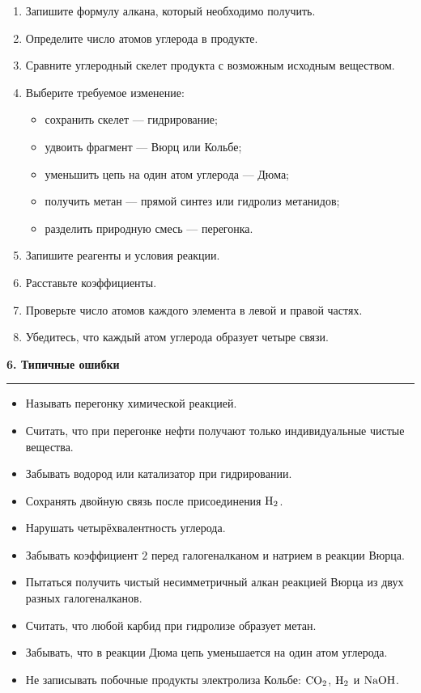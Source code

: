 \documentclass[a4paper,12pt]{article}
\newcommand{\sectiontitle}[1]{%
    \vspace{0.9em}%
    {\Large\bfseries\color{darkaccent}#1\par}%
    \vspace{0.2em}%
    {\color{accent}\rule{\linewidth}{0.8pt}}%
    \vspace{0.45em}%
}
\begin{document}
\begin{enumerate}
    \item Запишите формулу алкана, который необходимо получить.
    \item Определите число атомов углерода в продукте.
    \item Сравните углеродный скелет продукта с возможным исходным веществом.
    \item Выберите требуемое изменение:
    \begin{itemize}
        \item сохранить скелет --- гидрирование;
        \item удвоить фрагмент --- Вюрц или Кольбе;
        \item уменьшить цепь на один атом углерода --- Дюма;
        \item получить метан --- прямой синтез или гидролиз метанидов;
        \item разделить природную смесь --- перегонка.
    \end{itemize}
    \item Запишите реагенты и условия реакции.
    \item Расставьте коэффициенты.
    \item Проверьте число атомов каждого элемента в левой и правой частях.
    \item Убедитесь, что каждый атом углерода образует четыре связи.
\end{enumerate}

\sectiontitle{6. Типичные ошибки}

\begin{itemize}
    \item Называть перегонку химической реакцией.
    \item Считать, что при перегонке нефти получают только индивидуальные
    чистые вещества.
    \item Забывать водород или катализатор при гидрировании.
    \item Сохранять двойную связь после присоединения \(\ce{H2}\).
    \item Нарушать четырёхвалентность углерода.
    \item Забывать коэффициент \(2\) перед галогеналканом и натрием
    в реакции Вюрца.
    \item Пытаться получить чистый несимметричный алкан реакцией Вюрца
    из двух разных галогеналканов.
    \item Считать, что любой карбид при гидролизе образует метан.
    \item Забывать, что в реакции Дюма цепь уменьшается на один атом углерода.
    \item Не записывать побочные продукты электролиза Кольбе:
    \(\ce{CO2}\), \(\ce{H2}\) и \(\ce{NaOH}\).
\end{itemize}
\end{document}
